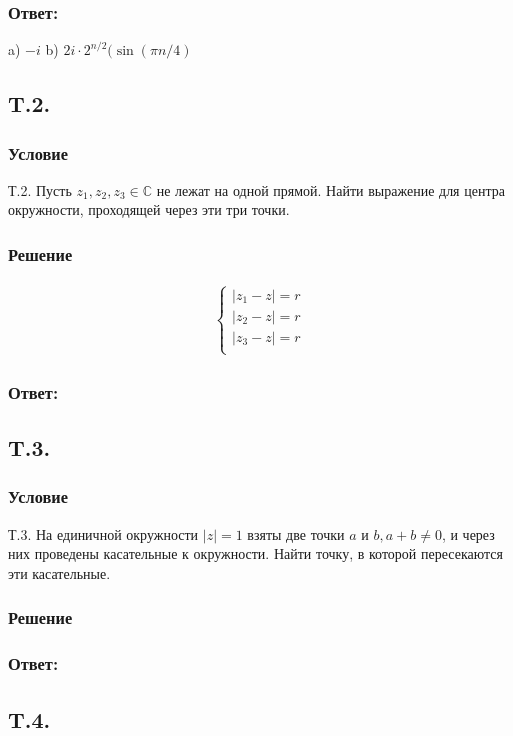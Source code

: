 \documentclass{article}
\begin{document}
\subsubsection*{Ответ:}
a) $-i$ b) $2i \cdot 2^{n/2} (\sin{( \pi n /4)}$
\subsection{T.2.}
\subsubsection*{Условие}
Т.2. Пусть $z_{1}, z_{2}, z_{3} \in \mathbb{C}$ не лежат на одной прямой. Найти выражение для центра окружности, проходящей через эти три точки.
\subsubsection*{Решение} 
\begin{gather*}
       \begin{cases}
           |z_1-z|=r\\
           |z_2-z|=r\\ 
           |z_3-z|=r\\
       \end{cases}
   \end{gather*}   
\subsubsection*{Ответ:}

\subsection{T.3.}
\subsubsection*{Условие}
Т.3. На единичной окружности $|z|=1$ взяты две точки $a$ и $b, a+b \neq 0$, и через них проведены касательные к окружности. Найти точку, в которой пересекаются эти касательные.
\subsubsection*{Решение}    
\subsubsection*{Ответ:}

\subsection{T.4.}
\end{document}
